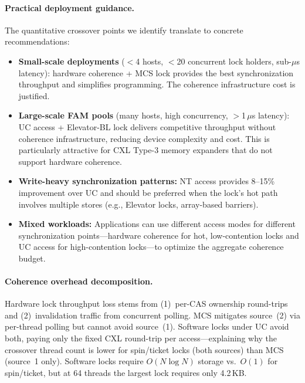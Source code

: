 \paragraph{Practical deployment guidance.}
The quantitative crossover points we identify translate to concrete recommendations:
\begin{itemize}
    \item \textbf{Small-scale deployments} ($<$4 hosts, $<$20 concurrent lock holders, sub-$\mu$s latency): hardware coherence + MCS lock provides the best synchronization throughput and simplifies programming. The coherence infrastructure cost is justified.
    \item \textbf{Large-scale FAM pools} (many hosts, high concurrency, $>$1\,$\mu$s latency): UC access + Elevator-BL lock delivers competitive throughput without coherence infrastructure, reducing device complexity and cost. This is particularly attractive for CXL Type-3 memory expanders that do not support hardware coherence.
    \item \textbf{Write-heavy synchronization patterns:} NT access provides 8--15\% improvement over UC and should be preferred when the lock's hot path involves multiple stores (e.g., Elevator locks, array-based barriers).
    \item \textbf{Mixed workloads:} Applications can use different access modes for different synchronization points---hardware coherence for hot, low-contention locks and UC access for high-contention locks---to optimize the aggregate coherence budget.
\end{itemize}

\paragraph{Coherence overhead decomposition.}
Hardware lock throughput loss stems from (1)~per-CAS ownership round-trips and (2)~invalidation traffic from concurrent polling.
MCS mitigates source~(2) via per-thread polling but cannot avoid source~(1).
Software locks under UC avoid both, paying only the fixed CXL round-trip per access---explaining why the crossover thread count is lower for spin/ticket locks (both sources) than MCS (source~1 only).
Software locks require $O(N \log N)$ storage vs.\ $O(1)$ for spin/ticket, but at 64 threads the largest lock requires only 4.2\,KB.
